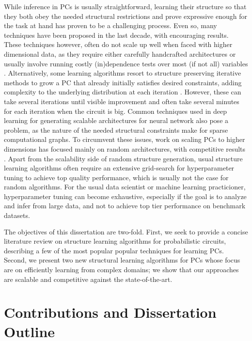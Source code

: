 While inference in PCs is usually straightforward, learning their structure so that they both
obey the needed structural restrictions and prove expressive enough for the task at hand has proven
to be a challenging process. Even so, many techniques have been proposed in the last decade, with
encouraging results. These techniques however, often do not scale up well when faced with higher
dimensional data, as they require either carefully handcrafted architectures
\citep{poon11,cheng14,nath16} or usually involve running costly (in)dependence tests over most (if
not all) variables \citep{gens13,jaini18a,vergari15,dimauro17a}. Alternatively, some learning
algorithms resort to structure preserving iterative methods to grow a PC that already initially
satisfies desired constraints, adding complexity to the underlying distribution at each iteration
\citep{liang17,dang20}. However, these can take several iterations until visible improvement and
often take several minutes for each iteration when the circuit is big. Common techniques used in
deep learning for generating scalable architectures for neural network also pose a problem, as the
nature of the needed structural constraints make for sparse computational graphs. To circumvent
these issues, work on scaling PCs to higher dimensions has focused mainly on random architectures,
with competitive results \citep{peharz20a,dimauro21,geh21a,peharz20b}. Apart from the scalability
side of random structure generation, usual structure learning algorithms often require an extensive
grid-search for hyperparameter tuning to achieve top quality performance, which is usually not the
case for random algorithms. For the usual data scientist or machine learning practicioner,
hyperparameter tuning can become exhaustive, especially if the goal is to analyze and infer from
large data, and not to achieve top tier performance on benchmark datasets.

The objectives of this dissertation are two-fold. First, we seek to provide a concise literature
review on structure learning algorithms for probabilistic circuits, describing a few of the most
popular popular techniques for learning PCs. Second, we present two new structural learning
algorithms for PCs whose focus are on efficiently learning from complex domains; we show that our
approaches are scalable and competitive against the state-of-the-art.

\section{Contributions and Dissertation Outline}

